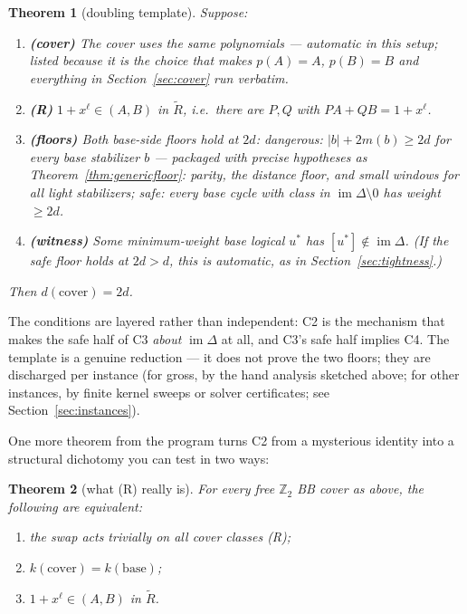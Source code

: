 \documentclass[11pt]{article}
\theoremstyle{plain}
\newtheorem{theorem}{Theorem}[section]
\theoremstyle{definition}
\theoremstyle{remark}
\newcommand{\Z}{\mathbb{Z}}
\newcommand{\imD}{\operatorname{im}\Delta}
\newcommand{\base}{\mathrm{base}}
\newcommand{\cov}{\mathrm{cover}}
\newcommand{\Rcov}{\widetilde{R}}
\newcommand{\wt}[1]{\lvert #1\rvert}
\begin{document}
\begin{theorem}[doubling template]\label{thm:template}
Suppose:
\begin{enumerate}[leftmargin=2.6em,label=\textbf{C\arabic*.}]
\item \textbf{(cover)} The cover uses the same polynomials --- automatic in
  this setup; listed because it is the choice that makes $p(A) = A$, $p(B) =
  B$ and everything in Section~\ref{sec:cover} run verbatim.
\item \textbf{(R)} $1 + x^\ell \in (A, B)$ in $\Rcov$, i.e.\ there are $P, Q$
  with $PA + QB = 1 + x^\ell$.
\item \textbf{(floors)} Both base-side floors hold at $2d$:
  \emph{dangerous:} $\wt{b} + 2m(b) \geq 2d$ for every base stabilizer $b$
  --- packaged with precise hypotheses as
  Theorem~\ref{thm:genericfloor}: parity, the distance floor, and small
  windows for all light stabilizers;
  \emph{safe:} every base cycle with class in $\imD \setminus 0$ has weight
  $\geq 2d$.
\item \textbf{(witness)} Some minimum-weight base logical $u^*$ has $[u^*]
  \notin \imD$. (If the safe floor holds at $2d > d$, this is automatic, as in
  Section~\ref{sec:tightness}.)
\end{enumerate}
Then $d(\cov) = 2d$.
\end{theorem}

The conditions are layered rather than independent: C2 is the mechanism that
makes the safe half of C3 \emph{about} $\imD$ at all, and C3's safe half
implies C4. The template is a genuine reduction --- it does not prove the two
floors; they are discharged per instance (for gross, by the hand analysis
sketched above; for other instances, by finite kernel sweeps or solver
certificates; see Section~\ref{sec:instances}).

One more theorem from the program turns C2 from a mysterious identity into a
structural dichotomy you can test in two ways:

\begin{theorem}[what (R) really is]\label{thm:A12}
For every free $\Z_2$ BB cover as above, the following are equivalent:
\begin{enumerate}[label=\emph{(\roman*)},leftmargin=2.4em]
\item the swap acts trivially on all cover classes \emph{(R)};
\item $k(\cov) = k(\base)$;
\item $1 + x^\ell \in (A, B)$ in $\Rcov$.
\end{enumerate}
\end{theorem}
\end{document}
